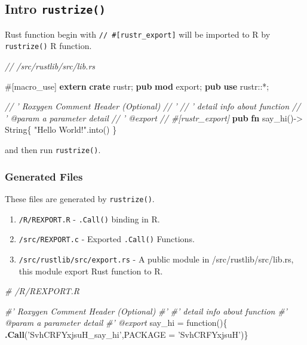 \documentclass[]{book}
\newenvironment{Shaded}{\begin{snugshade}}{\end{snugshade}}
\newcommand{\KeywordTok}[1]{\textcolor[rgb]{0.13,0.29,0.53}{\textbf{{#1}}}}
\newcommand{\DataTypeTok}[1]{\textcolor[rgb]{0.13,0.29,0.53}{{#1}}}
\newcommand{\StringTok}[1]{\textcolor[rgb]{0.31,0.60,0.02}{{#1}}}
\newcommand{\CommentTok}[1]{\textcolor[rgb]{0.56,0.35,0.01}{\textit{{#1}}}}
\newcommand{\AttributeTok}[1]{\textcolor[rgb]{0.77,0.63,0.00}{{#1}}}
\newcommand{\NormalTok}[1]{{#1}}
\providecommand{\tightlist}{%
  \setlength{\itemsep}{0pt}\setlength{\parskip}{0pt}}
\begin{document}
\subsection{\texorpdfstring{Intro
\texttt{rustrize()}}{Intro rustrize()}}\label{intro-rustrize}

Rust function begin with \texttt{//\ \#{[}rustr\_export{]}} will be
imported to R by \texttt{rustrize()} R function.

\begin{Shaded}
\begin{Highlighting}[]
\CommentTok{// /src/rustlib/src/lib.rs}

\AttributeTok{#[}\NormalTok{macro_use}\AttributeTok{]}
\KeywordTok{extern} \KeywordTok{crate} \NormalTok{rustr;}
\KeywordTok{pub} \KeywordTok{mod} \NormalTok{export;}
\KeywordTok{pub} \KeywordTok{use} \NormalTok{rustr::*;}

\CommentTok{// ' Roxygen Comment Header (Optional)}
\CommentTok{// ' }
\CommentTok{// ' detail info about function}
\CommentTok{// ' @param a parameter detail}
\CommentTok{// ' @export}
\CommentTok{// #[rustr_export]}
\KeywordTok{pub} \KeywordTok{fn} \NormalTok{say_hi()-> }\DataTypeTok{String}\NormalTok{\{}
    \StringTok{"Hello World!"}\NormalTok{.into()}
\NormalTok{\}}
\end{Highlighting}
\end{Shaded}

and then run \texttt{rustrize()}.

\subsubsection{Generated Files}\label{generated-files}

These files are generated by \texttt{rustrize()}.

\begin{enumerate}
\def\labelenumi{\arabic{enumi}.}
\tightlist
\item
  \texttt{/R/REXPORT.R} - \texttt{.Call()} binding in R.
\item
  \texttt{/src/REXPORT.c} - Exported \texttt{.Call()} Functions.
\item
  \texttt{/src/rustlib/src/export.rs} - A public module in
  /src/rustlib/src/lib.rs, this module export Rust function to R.
\end{enumerate}

\begin{Shaded}
\begin{Highlighting}[]
\CommentTok{# /R/REXPORT.R}

\CommentTok{#' Roxygen Comment Header (Optional)}
\CommentTok{#' }
\CommentTok{#' detail info about function}
\CommentTok{#' @param a parameter detail}
\CommentTok{#' @export}
\NormalTok{say_hi =}\StringTok{ }\NormalTok{function()\{ }\KeywordTok{.Call}\NormalTok{(}\StringTok{'SvhCRFYxjsuH_say_hi'}\NormalTok{,}\DataTypeTok{PACKAGE =} \StringTok{'SvhCRFYxjsuH'}\NormalTok{)\}}
\end{Highlighting}
\end{Shaded}
\end{document}
